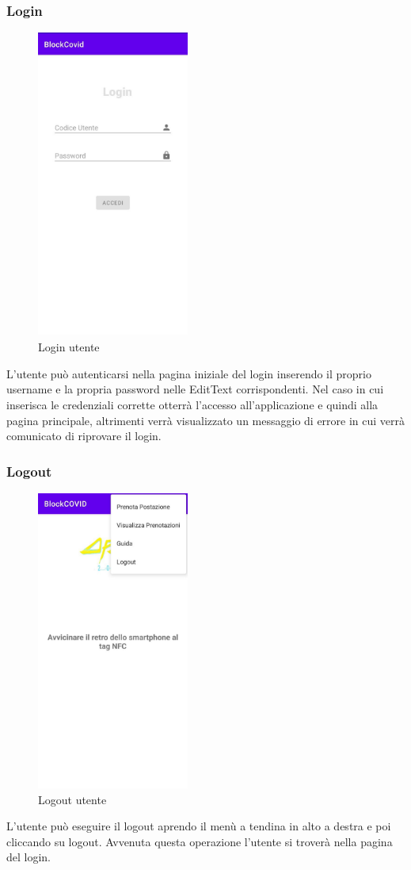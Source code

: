 \subsubsection{Login}
\begin{figure}[H]
	\centering
	\includegraphics[width=5cm]{res/images/login.png}
	\caption{Login utente}
\end{figure}
L'utente può autenticarsi nella pagina iniziale del login inserendo il proprio username e la propria password nelle EditText corrispondenti.
Nel caso in cui inserisca le credenziali corrette otterrà l'accesso all'applicazione e quindi alla pagina principale, altrimenti verrà visualizzato un messaggio di errore in cui verrà comunicato di riprovare il login.

\subsubsection{Logout}
\begin{figure}[H]
	\centering
	\includegraphics[width=5cm]{res/images/menuATendina.png}
	\caption{Logout utente}
\end{figure}
L'utente può eseguire il logout aprendo il menù a tendina in alto a destra e poi cliccando su logout. Avvenuta questa operazione l'utente si troverà nella pagina del login.

